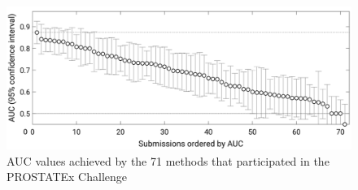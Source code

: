 \begin{figure}[!h]
\centering
\includegraphics[width=1\textwidth, keepaspectratio=true]{./figures/challenge_all_results.png}
\caption{AUC values achieved by the 71 methods that participated in the PROSTATEx Challenge~\cite{42}}
\label{fig:challenge_all_results}
\end{figure}



